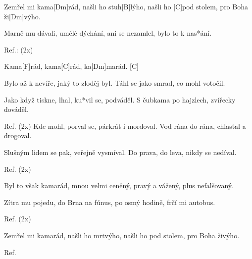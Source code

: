 
Zemřel mi kama[Dm]rád, 
našli ho stuh[B]lýho, 
našli ho [C]pod stolem, 
pro Boha ži[Dm]výho.

Marně mu dávali,
umělé dýchání,
ani se nezamlel,
bylo to k nas*ání.

Ref.: (2x)

Kama[F]rád, kama[C]rád, ka[Dm]marád. [C]

Bylo až k nevíře,
jaký to zloděj byl.
Táhl se jako smrad,
co mohl votočil.

Jako když tiskne, lhal,
ku*vil se, podváděl.
S čubkama po hajzlech,
zvířecky dováděl.

Ref. (2x)
\slpc
Kde mohl, porval se,
párkrát i mordoval.
Vod rána do rána,
chlastal a drogoval.

Slušným lidem se pak,
veřejně vysmíval.
Do prava, do leva,
nikdy se nedíval.

Ref. (2x)

Byl to však kamarád,
mnou velmi ceněný,
pravý a vážený,
plus nefalšovaný.

Zítra mu pojedu,
do Brna na fúnus,
po osmý hodině,
frčí mi autobus.

Ref. (2x)

Zemřel mi kamarád,
našli ho mrtvýho,
našli ho pod stolem,
pro Boha živýho.

Ref. 
